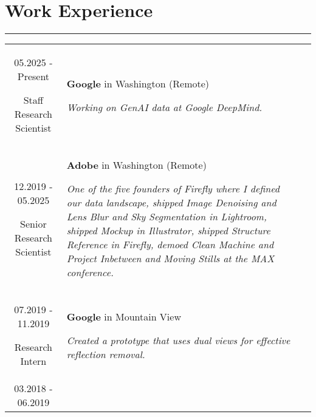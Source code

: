 \documentclass[10pt]{article}
\begin{document}
\section*{Work Experience}
\vspace{-0.3cm}
{\color{E6E6E6} \hrule height 0.04cm}
\vspace{0.4cm}
\renewcommand{\arraystretch}{1.0}
\begin{tabular}{C Z D}
	{
		05.2025 - Present
		
		\vspace{-0.05cm}
		
		{\scriptsize Staff Research Scientist}
	}
	&
	{	
		{\bf Google} {\scriptsize in Washington (Remote)}
		
		\vspace{0.05cm}
		
		{\scriptsize \it Working on GenAI data at Google DeepMind.}
		
		\vspace{0.0cm}
	}
	\\
	{
		12.2019 - 05.2025
		
		\vspace{-0.05cm}
		
		{\scriptsize Senior Research Scientist}
	}
	&
	{	
		{\bf Adobe} {\scriptsize in Washington (Remote)}
		
		\vspace{0.05cm}
		
		{\scriptsize \it One of the five founders of Firefly where I defined our data landscape, shipped Image Denoising and Lens Blur and Sky Segmentation in Lightroom, shipped Mockup in Illustrator, shipped Structure Reference in Firefly, demoed Clean Machine and Project Inbetween and Moving Stills at the MAX conference.}
		
		\vspace{0.0cm}
	}
	\\
	{
		07.2019 - 11.2019
		
		\vspace{-0.05cm}
		
		{\scriptsize Research Intern}
	}
	&
	{	
		{\bf Google} {\scriptsize in Mountain View}
		
		\vspace{0.05cm}
		
		{\scriptsize \it Created a prototype that uses dual views for effective reflection removal.}
		
		\vspace{0.0cm}
	}
	\\
	{
		03.2018 - 06.2019
		
}
\end{tabular}
\end{document}
